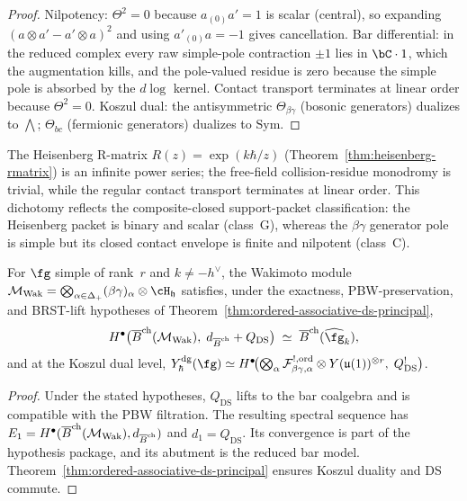 \begin{proof}
Nilpotency: $\Theta^2 = 0$ because
$a_{(0)}a' = 1$ is scalar (central), so expanding
$(a\otimes a' - a'\otimes a)^2$ and using $a'_{(0)}a = -1$
gives cancellation. Bar differential: in the reduced complex
every raw simple-pole contraction $\pm 1$ lies in $\bC\cdot 1$,
which the augmentation kills, and the pole-valued residue is zero
because the simple pole is absorbed by the $d\log$ kernel. Contact
transport terminates at linear order because $\Theta^2=0$. Koszul dual: the antisymmetric
$\Theta_{\beta\gamma}$ (bosonic generators) dualizes to
$\bigwedge$; $\Theta_{bc}$ (fermionic generators) dualizes
to $\mathrm{Sym}$.
\end{proof}

\begin{remark}
\label{rem:bg-vs-heisenberg}
The Heisenberg R-matrix $R(z) = \exp(k\hbar/z)$
(Theorem~\ref{thm:heisenberg-rmatrix}) is an infinite power
series; the free-field collision-residue monodromy is trivial, while
the regular contact transport terminates at linear order. This
dichotomy reflects the composite-closed support-packet classification:
the Heisenberg packet is binary and scalar (class~G), whereas the
$\beta\gamma$ generator pole is simple but its closed contact envelope
is finite and nilpotent (class~C).
\end{remark}

\begin{theorem}
\label{thm:wakimoto-ordered-bar}
For $\fg$ simple of rank~$r$ and $k \neq -h^\vee$, the
Wakimoto module
$\mathcal{M}_{\mathrm{Wak}}
= \bigotimes_{\alpha\in\Delta_+}(\beta\gamma)_\alpha
\otimes \cH_{\mathfrak{h}}$
satisfies, under the exactness, PBW-preservation, and BRST-lift
hypotheses of Theorem~\ref{thm:ordered-associative-ds-principal},
\begin{equation}\label{eq:wakimoto-ordered-bar-descent}
H^\bullet\bigl(
 \Barch(\mathcal{M}_{\mathrm{Wak}}),\;
 d_{\Barch} + Q_{\mathrm{DS}}\bigr)
\;\simeq\; \Barch(\widehat{\fg}_k),
\end{equation}
and at the Koszul dual level,
$Y^{\mathrm{dg}}_\hbar(\fg)
\simeq H^\bullet\!\bigl(
 \bigotimes_\alpha
 \mathcal{F}_{\beta\gamma,\alpha}^{!,\mathrm{ord}}
 \otimes Y(\mathfrak{u}(1))^{\otimes r},\;
 Q_{\mathrm{DS}}^!\bigr)$.
\end{theorem}

\begin{proof}
Under the stated hypotheses, $Q_{\mathrm{DS}}$ lifts to the bar
coalgebra and is compatible with the PBW filtration. The resulting
spectral sequence has
$E_1=H^\bullet(\overline{B}^{\mathrm{ch}}(\mathcal{M}_{\mathrm{Wak}}),d_{\overline{B}^{\mathrm{ch}}})$ and
$d_1=Q_{\mathrm{DS}}$. Its convergence is part of the hypothesis
package, and its abutment is the reduced bar model.
Theorem~\ref{thm:ordered-associative-ds-principal}
ensures Koszul duality and DS commute.
\end{proof}

